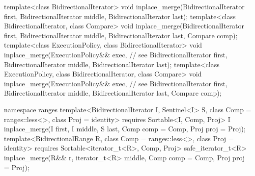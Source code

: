 \begin{codeblock}
  template<class BidirectionalIterator>
    void inplace_merge(BidirectionalIterator first,
                       BidirectionalIterator middle,
                       BidirectionalIterator last);
  template<class BidirectionalIterator, class Compare>
    void inplace_merge(BidirectionalIterator first,
                       BidirectionalIterator middle,
                       BidirectionalIterator last, Compare comp);
  template<class ExecutionPolicy, class BidirectionalIterator>
    void inplace_merge(ExecutionPolicy&& exec, // see 
                       BidirectionalIterator first,
                       BidirectionalIterator middle,
                       BidirectionalIterator last);
  template<class ExecutionPolicy, class BidirectionalIterator, class Compare>
    void inplace_merge(ExecutionPolicy&& exec, // see 
                       BidirectionalIterator first,
                       BidirectionalIterator middle,
                       BidirectionalIterator last, Compare comp);
\end{codeblock}\begin{addedblock}\begin{codeblock}
  namespace ranges {
    template<BidirectionalIterator I, Sentinel<I> S, class Comp = ranges::less<>,
        class Proj = identity>
      requires Sortable<I, Comp, Proj>
      I inplace_merge(I first, I middle, S last, Comp comp = Comp{}, Proj proj = Proj{});
    template<BidirectionalRange R, class Comp = ranges::less<>, class Proj = identity>
      requires Sortable<iterator_t<R>, Comp, Proj>
      safe_iterator_t<R>
        inplace_merge(R&& r, iterator_t<R> middle, Comp comp = Comp{},
                      Proj proj = Proj{});
  }
\end{codeblock}\end{addedblock}\begin{codeblock}


\end{codeblock}

